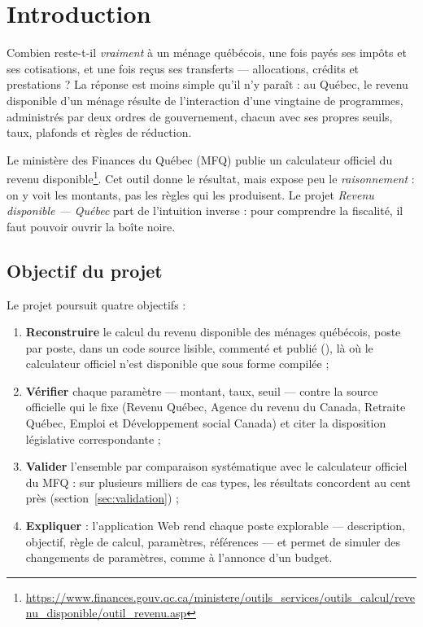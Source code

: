 \section{Introduction}
\label{sec:introduction}

Combien reste-t-il \emph{vraiment} à un ménage québécois, une fois payés ses
impôts et ses cotisations, et une fois reçus ses transferts --- allocations,
crédits et prestations ? La réponse est moins simple qu'il n'y paraît : au
Québec, le revenu disponible d'un ménage résulte de l'interaction d'une
vingtaine de programmes, administrés par deux ordres de gouvernement, chacun
avec ses propres seuils, taux, plafonds et règles de réduction.

Le ministère des Finances du Québec (MFQ) publie un calculateur officiel du
revenu disponible\footnote{\url{https://www.finances.gouv.qc.ca/ministere/outils_services/outils_calcul/revenu_disponible/outil_revenu.asp}}.
Cet outil donne le résultat, mais expose peu le \emph{raisonnement} : on y
voit les montants, pas les règles qui les produisent. Le projet
\emph{Revenu disponible --- Québec} part de l'intuition inverse : pour
comprendre la fiscalité, il faut pouvoir ouvrir la boîte noire.

\subsection{Objectif du projet}

Le projet poursuit quatre objectifs :

\begin{enumerate}
  \item \textbf{Reconstruire} le calcul du revenu disponible des ménages
        québécois, poste par poste, dans un code source lisible, commenté et
        publié (\ghurl), là où le calculateur officiel n'est disponible que
        sous forme compilée ;
  \item \textbf{Vérifier} chaque paramètre --- montant, taux, seuil ---
        contre la source officielle qui le fixe (Revenu Québec, Agence du
        revenu du Canada, Retraite Québec, Emploi et Développement social
        Canada) et citer la disposition législative correspondante ;
  \item \textbf{Valider} l'ensemble par comparaison systématique avec le
        calculateur officiel du MFQ : sur plusieurs milliers de cas types,
        les résultats concordent au cent près
        (section~\ref{sec:validation}) ;
  \item \textbf{Expliquer} : l'application Web rend chaque poste
        explorable --- description, objectif, règle de calcul, paramètres,
        références --- et permet de simuler des changements de paramètres,
        comme à l'annonce d'un budget.
\end{enumerate}

